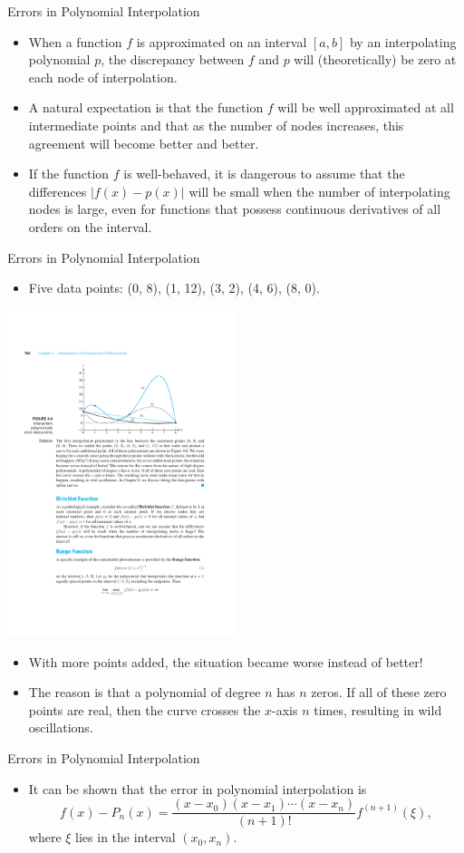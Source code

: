 \documentclass{beamer}
\begin{document}
\begin{frame}{Errors in Polynomial Interpolation}
\begin{itemize}
\item When a function  $f$ is approximated on an interval $[a,b]$ by an interpolating polynomial $p$, the discrepancy between $f$ and $p$ will (theoretically) be zero at each node of interpolation. 
\item A natural expectation is that the function $f$ will be well approximated at all intermediate points and that as the number of nodes increases, this agreement will become better and better.
\item If the function $f$ is well-behaved,  it is \alert{dangerous} to  assume that the differences
$|f(x)-p(x)|$ will be small when the number of interpolating nodes is large, even for functions that possess continuous derivatives of all orders on the interval.
\end{itemize}
\end{frame}
\begin{frame}{Errors in Polynomial Interpolation}
\begin{itemize}
\item  Five data points: (0, 8), (1, 12), (3, 2), (4, 6), (8, 0).
\end{itemize}
\centerline{\includegraphics[width=0.5\textwidth]{Lec9_Fig5}}
\begin{itemize}
\item With more points added, the situation became \alert{worse} instead of better!
\item The reason is that  a polynomial of degree $n$ has $n$ zeros. 
If all of these zero points are real, then the curve crosses the $x$-axis $n$ times, resulting in \alert{wild oscillations}. 
\end{itemize}
\end{frame}
\begin{frame}{Errors in Polynomial Interpolation}
\begin{itemize}
\item  It can be shown that the error in polynomial interpolation is 
\[
f(x)-P_n(x)=\frac{(x-x_0)(x-x_1)\cdots(x-x_n)}{(n+1)!} f^{(n+1)}(\xi),
\]
where $\xi$ lies in the interval $(x_0, x_n)$.
\end{itemize}
\end{frame}
\end{document}
